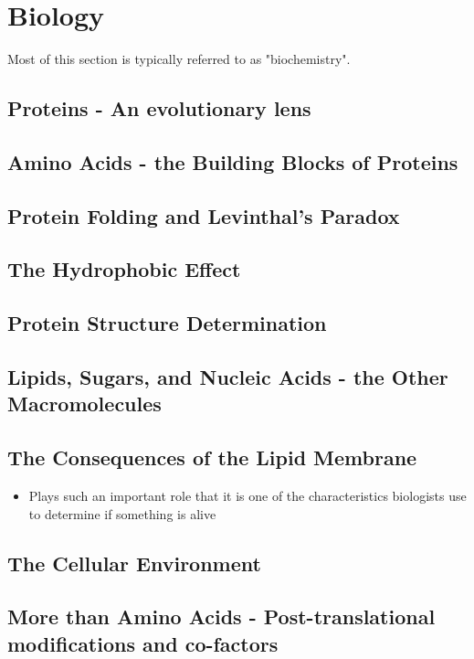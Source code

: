 \chapter{Biology} \label{bio_foundations}

Most of this section is typically referred to as "biochemistry". 

\section{Proteins - An evolutionary lens}

\section{Amino Acids - the Building Blocks of Proteins}

\section{Protein Folding and Levinthal's Paradox}

\section{The Hydrophobic Effect}

\section{Protein Structure Determination}

\section{Lipids, Sugars, and Nucleic Acids - the Other Macromolecules}

\section{The Consequences of the Lipid Membrane}
\begin{itemize}
    \item Plays such an important role that it is one of the characteristics biologists use to determine if something is alive
\end{itemize}

\section{The Cellular Environment}

\section{More than Amino Acids - Post-translational modifications and co-factors }